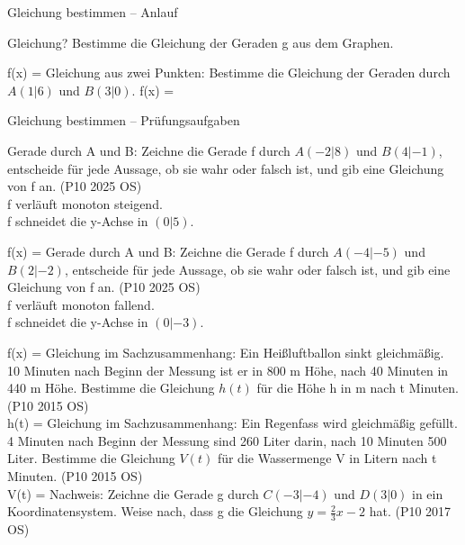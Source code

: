 \begin{aufgabe}{Gleichung bestimmen – Anlauf}
\begin{teile}
\teil Gleichung? Bestimme die Gleichung der Geraden g aus dem Graphen.

\begin{ksys}[xmin=-5,xmax=5,ymin=-5,ymax=5,ablesen]  \end{ksys}
f(x) = \leerfeld
\teil Gleichung aus zwei Punkten: Bestimme die Gleichung der Geraden durch $A(1|6)$ und $B(3|0)$. f(x) = \leerfeld
\end{teile}
\end{aufgabe}

\begin{aufgabe}{Gleichung bestimmen – Prüfungsaufgaben}
\begin{teile}
\teil Gerade durch A und B: Zeichne die Gerade f durch $A(-2|8)$ und $B(4|-1)$, entscheide für jede Aussage, ob sie wahr oder falsch ist, und gib eine Gleichung von f an. \hfill (P10 2025 OS) \\  f verläuft monoton steigend. \\  f schneidet die y-Achse in $(0|5)$.

\begin{ksys}[xmin=-4,xmax=5,ymin=-4,ymax=9] \end{ksys}
f(x) = \leerfeld
\teil Gerade durch A und B: Zeichne die Gerade f durch $A(-4|-5)$ und $B(2|-2)$, entscheide für jede Aussage, ob sie wahr oder falsch ist, und gib eine Gleichung von f an. \hfill (P10 2025 OS) \\  f verläuft monoton fallend. \\  f schneidet die y-Achse in $(0|-3)$.

\begin{ksys}[xmin=-5,xmax=4,ymin=-6,ymax=4] \end{ksys}
f(x) = \leerfeld
\steil Gleichung im Sachzusammenhang: Ein Heißluftballon sinkt gleichmäßig. 10 Minuten nach Beginn der Messung ist er in 800 m Höhe, nach 40 Minuten in 440 m Höhe. Bestimme die Gleichung $h(t)$ für die Höhe h in m nach t Minuten. \hfill (P10 2015 OS) \\ h(t) = \leerfeld
\steil Gleichung im Sachzusammenhang: Ein Regenfass wird gleichmäßig gefüllt. 4 Minuten nach Beginn der Messung sind 260 Liter darin, nach 10 Minuten 500 Liter. Bestimme die Gleichung $V(t)$ für die Wassermenge V in Litern nach t Minuten. \hfill (P10 2015 OS) \\ V(t) = \leerfeld
\teil Nachweis: Zeichne die Gerade g durch $C(-3|-4)$ und $D(3|0)$ in ein Koordinatensystem. Weise nach, dass g die Gleichung $y = \frac{2}{3}x - 2$ hat. \hfill (P10 2017 OS)


\end{teile}
\end{aufgabe}
